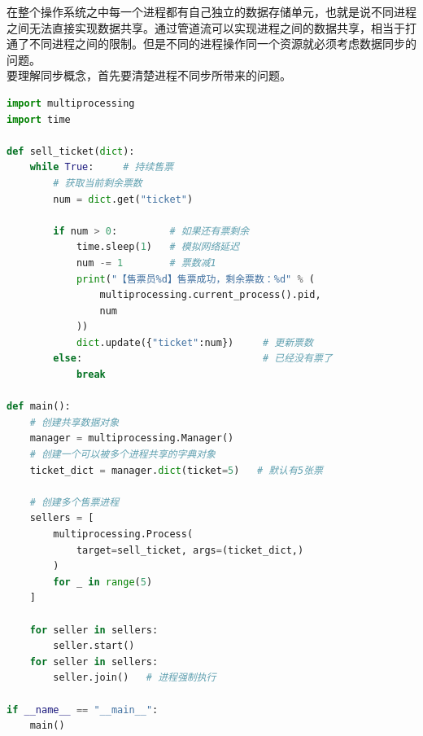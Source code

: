 在整个操作系统之中每一个进程都有自己独立的数据存储单元，也就是说不同进程之间无法直接实现数据共享。通过管道流可以实现进程之间的数据共享，相当于打通了不同进程之间的限制。但是不同的进程操作同一个资源就必须考虑数据同步的问题。 \\

要理解同步概念，首先要清楚进程不同步所带来的问题。 \\

\begin{lstlisting}[language=Python]
import multiprocessing
import time

def sell_ticket(dict):
	while True:     # 持续售票
		# 获取当前剩余票数
		num = dict.get("ticket")
		
		if num > 0:         # 如果还有票剩余
			time.sleep(1)   # 模拟网络延迟
			num -= 1        # 票数减1
			print("【售票员%d】售票成功，剩余票数：%d" % (
				multiprocessing.current_process().pid,
				num
			))
			dict.update({"ticket":num})     # 更新票数
		else:                				# 已经没有票了
			break

def main():
	# 创建共享数据对象
	manager = multiprocessing.Manager()
	# 创建一个可以被多个进程共享的字典对象
	ticket_dict = manager.dict(ticket=5)   # 默认有5张票

	# 创建多个售票进程
	sellers = [
		multiprocessing.Process(
			target=sell_ticket, args=(ticket_dict,)
		) 
		for _ in range(5)
	]

	for seller in sellers:
		seller.start()
	for seller in sellers:
		seller.join()   # 进程强制执行

if __name__ == "__main__":
	main()
\end{lstlisting}

